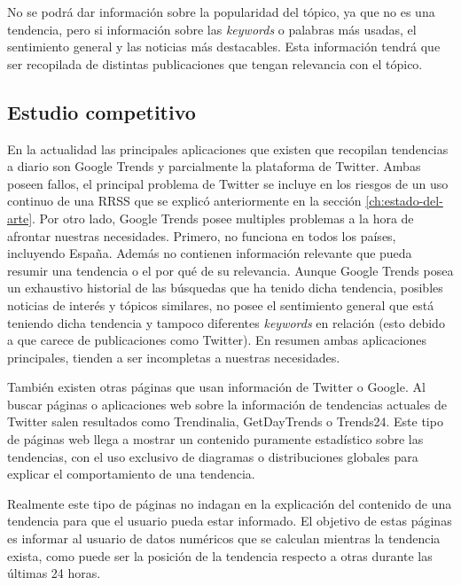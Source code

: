 \vspace{0.3cm}

No se podrá dar información sobre la popularidad del tópico, ya que no es una tendencia, pero si información sobre las \textit{keywords} o palabras más usadas, el sentimiento general y las noticias más destacables. Esta información tendrá que ser recopilada de distintas publicaciones que tengan relevancia con el tópico.

\subsection{Estudio competitivo}

En la actualidad las principales aplicaciones que existen que recopilan tendencias a diario son Google Trends y parcialmente la plataforma de Twitter. Ambas poseen fallos, el principal problema de Twitter se incluye en los riesgos de un uso continuo de una \ac{RRSS} que se explicó anteriormente en la sección \ref{ch:estado-del-arte}. Por otro lado, Google Trends posee multiples problemas a la hora de afrontar nuestras necesidades. Primero, no funciona en todos los países, incluyendo España. Además no contienen información relevante que pueda resumir una tendencia o el por qué de su relevancia. Aunque Google Trends posea un exhaustivo historial de las búsquedas que ha tenido dicha tendencia, posibles noticias de interés y tópicos similares, no posee el sentimiento general que está teniendo dicha tendencia y tampoco diferentes \textit{keywords} en relación (esto debido a que carece de publicaciones como Twitter). En resumen ambas aplicaciones principales, tienden a ser incompletas a nuestras necesidades.

\vspace{0.3cm}

También existen otras páginas que usan información de Twitter o Google. Al buscar páginas o aplicaciones web sobre la información de tendencias actuales de Twitter salen resultados como Trendinalia, GetDayTrends o Trends24. Este tipo de páginas web llega a mostrar un contenido puramente estadístico sobre las tendencias, con el uso exclusivo de diagramas o distribuciones globales para explicar el comportamiento de una tendencia.

\vspace{0.3cm}

Realmente este tipo de páginas no indagan en la explicación del contenido de una tendencia para que el usuario pueda estar informado. El objetivo de estas páginas es informar al usuario de datos numéricos que se calculan mientras la tendencia exista, como puede ser la posición de la tendencia respecto a otras durante las últimas 24 horas.

